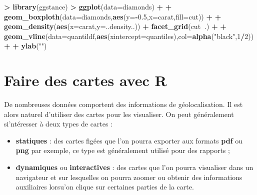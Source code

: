 \documentclass[]{article}
\newenvironment{Shaded}{\begin{snugshade}}{\end{snugshade}}
\newcommand{\DataTypeTok}[1]{\textcolor[rgb]{0.13,0.29,0.53}{#1}}
\newcommand{\DecValTok}[1]{\textcolor[rgb]{0.00,0.00,0.81}{#1}}
\newcommand{\FloatTok}[1]{\textcolor[rgb]{0.00,0.00,0.81}{#1}}
\newcommand{\KeywordTok}[1]{\textcolor[rgb]{0.13,0.29,0.53}{\textbf{#1}}}
\newcommand{\NormalTok}[1]{#1}
\newcommand{\OperatorTok}[1]{\textcolor[rgb]{0.81,0.36,0.00}{\textbf{#1}}}
\newcommand{\OtherTok}[1]{\textcolor[rgb]{0.56,0.35,0.01}{#1}}
\newcommand{\StringTok}[1]{\textcolor[rgb]{0.31,0.60,0.02}{#1}}
\providecommand{\tightlist}{%
  \setlength{\itemsep}{0pt}\setlength{\parskip}{0pt}}
\theoremstyle{definition}
\theoremstyle{definition}
\theoremstyle{definition}
\theoremstyle{remark}
\begin{document}
\begin{Shaded}
\begin{Highlighting}[]
\OperatorTok{>}\StringTok{ }\KeywordTok{library}\NormalTok{(ggstance)}
\OperatorTok{>}\StringTok{ }\KeywordTok{ggplot}\NormalTok{(}\DataTypeTok{data=}\NormalTok{diamonds) }\OperatorTok{+}
\OperatorTok{+}\StringTok{   }\KeywordTok{geom_boxploth}\NormalTok{(}\DataTypeTok{data=}\NormalTok{diamonds,}\KeywordTok{aes}\NormalTok{(}\DataTypeTok{y=}\OperatorTok{-}\FloatTok{0.5}\NormalTok{,}\DataTypeTok{x=}\NormalTok{carat,}\DataTypeTok{fill=}\NormalTok{cut)) }\OperatorTok{+}
\OperatorTok{+}\StringTok{   }\KeywordTok{geom_density}\NormalTok{(}\KeywordTok{aes}\NormalTok{(}\DataTypeTok{x=}\NormalTok{carat,}\DataTypeTok{y=}\NormalTok{..density..)) }\OperatorTok{+}\StringTok{  }\KeywordTok{facet_grid}\NormalTok{(cut}\OperatorTok{~}\NormalTok{.) }\OperatorTok{+}
\OperatorTok{+}\StringTok{   }\KeywordTok{geom_vline}\NormalTok{(}\DataTypeTok{data=}\NormalTok{quantildf,}\KeywordTok{aes}\NormalTok{(}\DataTypeTok{xintercept=}\NormalTok{quantiles),}\DataTypeTok{col=}\KeywordTok{alpha}\NormalTok{(}\StringTok{"black"}\NormalTok{,}\DecValTok{1}\OperatorTok{/}\DecValTok{2}\NormalTok{))}\OperatorTok{+}
\OperatorTok{+}\StringTok{   }\KeywordTok{ylab}\NormalTok{(}\StringTok{""}\NormalTok{)}
\end{Highlighting}
\end{Shaded}

\begin{Shaded}
\end{Shaded}

\hypertarget{faire-des-cartes-avec-r}{%
\section{Faire des cartes avec R}\label{faire-des-cartes-avec-r}}

De nombreuses données comportent des informations de géolocalisation. Il est alors naturel d'utiliser des cartes pour les visualiser. On peut généralement si'ntéresser à deux types de cartes :

\begin{itemize}
\tightlist
\item
  \textbf{statiques} : des cartes figées que l'on pourra exporter aux formats \textbf{pdf} ou \textbf{png} par exemple, ce type est généralement utilisé pour des rapports ;
\item
  \textbf{dynamiques} ou \textbf{interactives} : des cartes que l'on pourra visualiser dans un navigateur et sur lesquelles on pourra zoomer ou obtenir des informations auxiliaires lorsu'on clique sur certaines parties de la carte.
\end{itemize}
\end{document}
